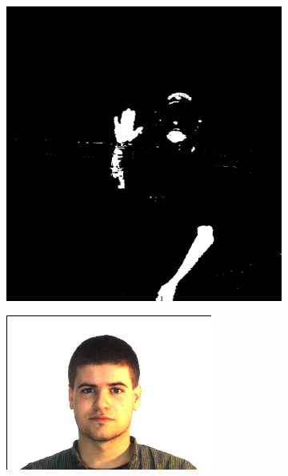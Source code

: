 \begin{figure}[h]
\begin{subfigure}[b]{0.18\textwidth}
     \end{subfigure}
    \hfill
     \begin{subfigure}[b]{0.18\textwidth}
         \centering
         \includegraphics[width=\textwidth]{images/results/base_st/wd2002-sue-shaded-hat_dyc.png}
     \end{subfigure}
     \begin{subfigure}[b]{0.18\textwidth}
         \centering
         \includegraphics[width=\textwidth]{images/results/base_st/m-022-5.color.d3_x.png}

\end{subfigure}
\end{figure}
